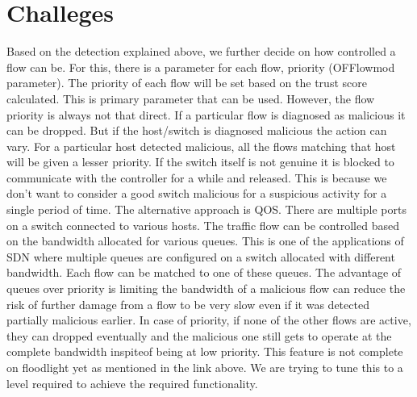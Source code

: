 \documentclass[conference]{IEEEtran}
\begin{document}
\section{\textbf{Challeges}}
Based on the detection explained above, we further decide on how controlled a flow can be. For this, there is a parameter for each flow, priority (OFFlowmod parameter). The priority of each flow will be set based on the trust score calculated. This is primary parameter that can be used. However, the flow priority is always not that direct. If a particular flow is diagnosed as malicious it can be dropped. But if the host/switch is diagnosed malicious the action can vary. For a particular host detected malicious, all the flows matching that host will be given a lesser priority. If the switch itself is not genuine it is blocked to communicate with the controller for a while and released. This is because we don’t want to consider a good switch malicious for a suspicious activity for a single period of time. The alternative approach is QOS. There are multiple ports on a switch connected to various hosts. The traffic flow can be controlled based on the bandwidth allocated for various queues. This is one of the applications of SDN where multiple queues are configured on a switch allocated with different bandwidth. Each flow can be matched to one of these queues. The advantage of queues over priority is limiting the bandwidth of a malicious flow can reduce the risk of further damage from a flow to be very slow even if it was detected partially malicious earlier. In case of priority, if none of the other flows are active, they can dropped eventually and the malicious one still gets to operate at the complete bandwidth inspiteof being at low priority. This feature is not complete on floodlight yet as mentioned in the link above. We are trying to tune this to a level required to achieve the required functionality.
%
%
\end{document}
